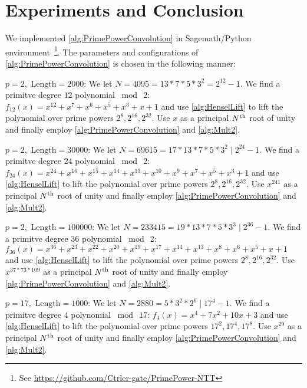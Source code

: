 \section{Experiments and Conclusion}
We implemented \cref{alg:PrimePowerConvolution} in Sagemath/Python \cite{OTHER:Stein05} environment~\footnote{See \url{https://github.com/Ctrler-gate/PrimePower-NTT}}. The parameters and configurations of \cref{alg:PrimePowerConvolution} is chosen in the following manner:

{\bf \(p = 2, \text{ Length} = 2000\)}: We let \(N = 4095 = 13 * 7 * 5 * 3^2 = 2^{12} - 1\). We find a primitve degree \(12\) polynomial \(\bmod \  2\): \(f_{12}(x) = x^{12} + x^7 + x^6 + x^5 + x^3 + x + 1\) and use \cref{alg:HenselLift} to lift the polynomial over prime powers \(2^8, 2^{16}, 2^{32}\). Use \(x\) as a principal \(N\textsuperscript{th}\) root of unity and finally employ \cref{alg:PrimePowerConvolution} and \cref{alg:Mult2}.

{\bf \(p = 2, \text{ Length} = 30000\)}: We let \(N = 69615 = 17 * 13 * 7 * 5 * 3^2 \mid 2^{24} - 1\). We find a primitve degree \(24\) polynomial \(\bmod \  2\): \(f_{24}(x) = x^{24} + x^{16} + x^{15} + x^{14} + x^{13} + x^{10} + x^9 + x^7 + x^5 + x^3 + 1\) and use \cref{alg:HenselLift} to lift the polynomial over prime powers \(2^8, 2^{16}, 2^{32}\). Use \(x^{241} \) as a principal \(N\textsuperscript{th}\) root of unity and finally employ \cref{alg:PrimePowerConvolution} and \cref{alg:Mult2}.

{\bf \(p = 2, \text{ Length} = 100000\)}: We let \(N = 233415 = 19 * 13 * 7 * 5 * 3^3 \mid 2^{36} - 1\). We find a primitve degree \(36\) polynomial \(\bmod \  2\): \(f_{36}(x) = x^{36} + x^{23} + x^{22} + x^{20} + x^{19} + x^{17} + x^{14} + x^{13} + x^8 + x^6 + x^5 + x + 1\) and use \cref{alg:HenselLift} to lift the polynomial over prime powers \(2^8, 2^{16}, 2^{32}\). Use \(x^{37*73*109} \) as a principal \(N\textsuperscript{th}\) root of unity and finally employ \cref{alg:PrimePowerConvolution} and \cref{alg:Mult2}.

\ifFullVersion

{\bf \(p = 17, \text{ Length} = 1000\)}: We let \(N = 2880 = 5 * 3^2 * 2^6 \mid 17^{4} - 1\). We find a primitve degree \(4\) polynomial \(\bmod \  17\): \(f_{4}(x) = x^4 + 7x^2 + 10x + 3\) and use \cref{alg:HenselLift} to lift the polynomial over prime powers \(17^2, 17^4, 17^8\). Use \(x^{29} \) as a principal \(N\textsuperscript{th}\) root of unity and finally employ \cref{alg:PrimePowerConvolution} and \cref{alg:Mult2}.


